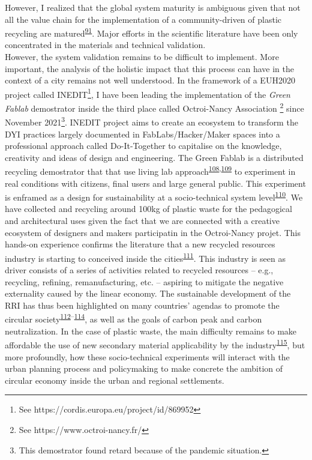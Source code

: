 \documentclass[
  12pt,
  a4paperpaper,
  onecolumn]{article}
\begin{document}
However, I realized that the global system maturity is ambiguous given
that not all the value chain for the implementation of a
community-driven of plastic recycling are
matured\textsuperscript{\protect\hyperlink{ref-CruzSanchez2020}{91}}.
Major efforts in the scientific literature have been only concentrated
in the materials and technical validation.\\
However, the system validation remains to be difficult to implement.
More important, the analysis of the holistic impact that this process
can have in the context of a city remains not well understood. In the
framework of a EUH2020 project called INEDIT\footnote{See
  https://cordis.europa.eu/project/id/869952}, I have been leading the
implementation of the \emph{Green Fablab} demostrator inside the third
place called Octroi-Nancy Association \footnote{See
  https://www.octroi-nancy.fr/} since November 2021\footnote{This
  demostrator found retard because of the pandemic situation.}. INEDIT
project aims to create an ecosystem to transform the DYI practices
largely documented in FabLabs/Hacker/Maker spaces into a professional
approach called Do-It-Together to capitalise on the knowledge,
creativity and ideas of design and engineering. The Green Fablab is a
distributed recycling demostrator that that use living lab
approach\textsuperscript{\protect\hyperlink{ref-tyl2021}{108},\protect\hyperlink{ref-compagnucci2020a}{109}}
to experiment in real conditions with citizens, final users and large
general public. This experiment is enframed as a design for
sustainability at a socio-technical system
level\textsuperscript{\protect\hyperlink{ref-Ceschin2016}{110}}. We have
collected and recycling around 100kg of plastic waste for the
pedagogical and architectural uses given the fact that we are connected
with a creative ecosystem of designers and makers participatin in the
Octroi-Nancy projet. This hands-on experience confirms the literature
that a new recycled resources industry is starting to conceived inside
the cities\textsuperscript{\protect\hyperlink{ref-wang2019b}{111}}. This
industry is seen as driver consists of a series of activities related to
recycled resources -- e.g., recycling, refining, remanufacturing, etc.
-- aspiring to mitigate the negative externality caused by the linear
economy. The sustainable development of the RRI has thus been
highlighted on many countries' agendas to promote the circular
society\textsuperscript{\protect\hyperlink{ref-leipold2021}{112}--\protect\hyperlink{ref-jaeger-erben2021a}{114}},
as well as the goals of carbon peak and carbon neutralization. In the
case of plastic waste, the main difficulty remains to make affordable
the use of new secondary material applicability by the
industry\textsuperscript{\protect\hyperlink{ref-klotz2022}{115}}, but
more profoundly, how these socio-technical experiments will interact
with the urban planning process and policymaking to make concrete the
ambition of circular economy inside the urban and regional settlements.
\end{document}
